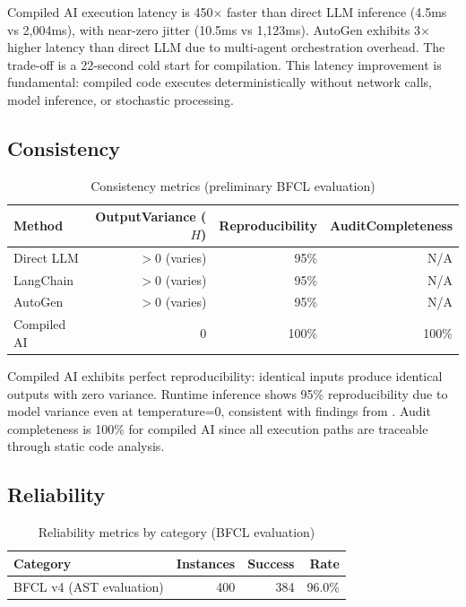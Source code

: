 \documentclass[11pt]{article}
\begin{document}
Compiled AI execution latency is 450$\times$ faster than direct LLM inference (4.5ms vs 2,004ms), with near-zero jitter (10.5ms vs 1,123ms). AutoGen exhibits 3$\times$ higher latency than direct LLM due to multi-agent orchestration overhead. The trade-off is a 22-second cold start for compilation. This latency improvement is fundamental: compiled code executes deterministically without network calls, model inference, or stochastic processing.

\subsection{Consistency}

\begin{table}[ht]
\centering
\caption{Consistency metrics (preliminary BFCL evaluation)}
\label{tab:consistency-results}
\begin{tabular}{lrrr}
\toprule
Method & OutputVariance ($H$) & Reproducibility & AuditCompleteness \\
\midrule
Direct LLM & $>$0 (varies) & 95\% & N/A \\
LangChain & $>$0 (varies) & 95\% & N/A \\
AutoGen & $>$0 (varies) & 95\% & N/A \\
Compiled AI & 0 & 100\% & 100\% \\
\bottomrule
\end{tabular}
\end{table}

Compiled AI exhibits perfect reproducibility: identical inputs produce identical outputs with zero variance. Runtime inference shows 95\% reproducibility due to model variance even at temperature=0, consistent with findings from \citet{atil2024nondeterminism}. Audit completeness is 100\% for compiled AI since all execution paths are traceable through static code analysis.

\subsection{Reliability}

\begin{table}[ht]
\centering
\caption{Reliability metrics by category (BFCL evaluation)}
\label{tab:reliability-results}
\begin{tabular}{lrrr}
\toprule
Category & Instances & Success & Rate \\
\midrule
BFCL v4 (AST evaluation) & 400 & 384 & 96.0\% \\
\bottomrule
\end{tabular}
\end{table}
\end{document}
